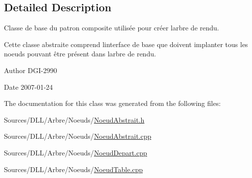 \subsection{Detailed Description}
Classe de base du patron composite utilisée pour créer l\textquotesingle{}arbre de rendu. 

Cette classe abstraite comprend l\textquotesingle{}interface de base que doivent implanter tous les noeuds pouvant être présent dans l\textquotesingle{}arbre de rendu.

\begin{DoxyAuthor}{Author}
D\+G\+I-\/2990 
\end{DoxyAuthor}
\begin{DoxyDate}{Date}
2007-\/01-\/24 
\end{DoxyDate}


The documentation for this class was generated from the following files\+:\begin{DoxyCompactItemize}
\item 
Sources/\+D\+L\+L/\+Arbre/\+Noeuds/\hyperlink{_noeud_abstrait_8h}{Noeud\+Abstrait.\+h}\item 
Sources/\+D\+L\+L/\+Arbre/\+Noeuds/\hyperlink{_noeud_abstrait_8cpp}{Noeud\+Abstrait.\+cpp}\item 
Sources/\+D\+L\+L/\+Arbre/\+Noeuds/\hyperlink{_noeud_depart_8cpp}{Noeud\+Depart.\+cpp}\item 
Sources/\+D\+L\+L/\+Arbre/\+Noeuds/\hyperlink{_noeud_table_8cpp}{Noeud\+Table.\+cpp}\end{DoxyCompactItemize}
